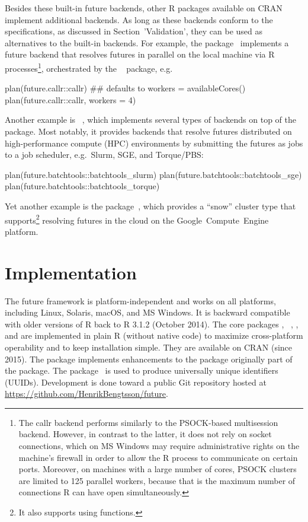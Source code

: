 Besides these built-in future backends, other R packages available on
CRAN implement additional backends.  As long as these backends conform
to the  specifications, as discussed in
Section~'Validation', they can be used as alternatives to the built-in
backends.
%
For example, the 
package~\citep{CRAN:future.callr} implements a future backend that
resolves futures in parallel on the local machine via R
processes\footnote{The callr backend performs similarly to the
PSOCK-based multisession backend. However, in contrast to the latter,
it does not rely on socket connections, which on MS Windows may
require administrative rights on the machine's firewall in order to
allow the R process to communicate on certain ports. Moreover, on
machines with a large number of cores, PSOCK clusters are limited to
125 parallel workers, because that is the maximum number of
connections R can have open simultaneously.}, orchestrated by
the ~\citep{CRAN:callr} package, e.g.
\begin{example}
plan(future.callr::callr)  ## defaults to workers = availableCores()
plan(future.callr::callr, workers = 4)
\end{example}
Another example
is ~\citep{CRAN:future.batchtools}, which
implements several types of backends on top of the
~\citep{Lang_etal_2017} package.  Most notably, it
provides backends that resolve futures distributed on high-performance
compute (HPC) environments by submitting the futures as jobs to a job
scheduler, e.g.\ Slurm, SGE, and Torque/PBS:
\begin{example}
plan(future.batchtools::batchtools_slurm)
plan(future.batchtools::batchtools_sge)
plan(future.batchtools::batchtools_torque)
\end{example}
%
Yet another example is the 
package~\citep{CRAN:googleComputeEngineR}, which provides a ``snow''
cluster type that supports\footnote{It also supports
using  functions.}  resolving futures in the cloud
on the Google~Compute~Engine platform.


\section{Implementation}

The future framework is platform-independent and works on all
platforms, including Linux, Solaris, macOS, and MS Windows.  It is
backward compatible with older versions of R back to R 3.1.2 (October
2014).  The core packages ,
~\citep{CRAN:parallelly}, , and
 are implemented in plain R (without native code) to
maximize cross-platform operability and to keep installation simple.
They are available on CRAN (since 2015).  The  package
implements enhancements to the  package originally part
of the  package.  The 
package~\citep{CRAN:digest} is used to produce universally unique
identifiers (UUIDs).  Development is done toward a public Git
repository hosted at \url{https://github.com/HenrikBengtsson/future}.

